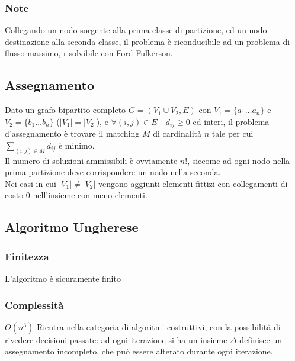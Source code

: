 \documentclass[../template]{subfiles}
\begin{document}
\subsubsection{Note}
Collegando un nodo sorgente alla prima classe di partizione, ed un nodo destinazione alla seconda classe, il problema è riconducibile ad un
problema di flusso massimo, risolvibile con Ford-Fulkerson.

\subsection{Assegnamento}
Dato un grafo bipartito completo $G = (V_1 \cup V_2, E)$ con $V_1 = \{a_1 \dots a_n\}$ e $V_2 = \{b_1 \dots b_n\}$ ($|V_1| = |V_2|$),
e $\forall (i, j) \in E \quad d_{ij} \ge 0$ ed interi,
il problema d'assegnamento è trovare il matching $M$ di cardinalità $n$ tale per cui
$\sum_{(i, j) \in M} d_{ij}$ è minimo.
\\[10pt]
Il numero di soluzioni ammissibili è ovviamente $n!$, siccome ad ogni nodo nella prima
partizione deve corrispondere un nodo nella seconda.
\\
Nei casi in cui $|V_1| \neq |V_2|$ vengono aggiunti elementi fittizi con collegamenti di costo 0 nell'insieme con meno elementi.

\subsection{Algoritmo Ungherese}


\subsubsection{Finitezza}
L'algoritmo è sicuramente finito
\subsubsection{Complessità}
$O(n^3)$
Rientra nella categoria di algoritmi costruttivi, con la possibilità di rivedere decisioni passate: ad ogni iterazione
si ha un insieme $\Delta$ definisce un assegnamento incompleto, che può essere alterato durante ogni iterazione.
\end{document}
